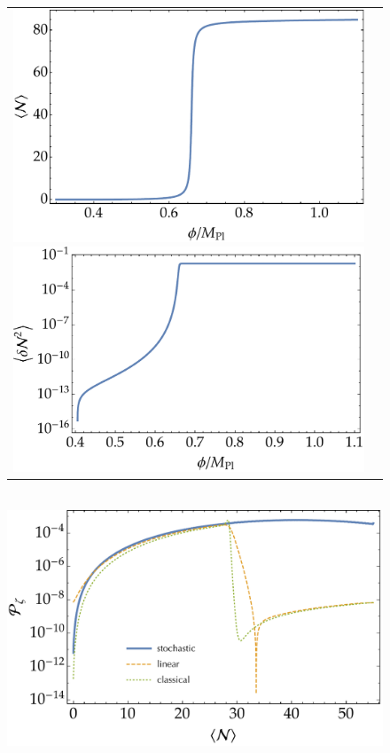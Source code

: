 \documentclass[aps, prd
, preprint
, nofootinbib 
, longbibliography
]{revtex4-1}
\begin{document}
\begin{figure}
	\centering
	\begin{tabular}{cc}
		\begin{minipage}{0.5\hsize}
			\centering
			\includegraphics[width=0.9\hsize]{figs/inflection/N_conf.pdf}
		\end{minipage}
		\begin{minipage}{0.5\hsize}
			\centering
			\includegraphics[width=0.9\hsize]{figs/inflection/dN2_conf.pdf}
		\end{minipage}
	\end{tabular} \\[10pt]
	\includegraphics[width=0.5\hsize]{figs/inflection/Pzeta_conf.pdf}
	\caption{}
	\label{figs: inflection_conf}
\end{figure}
\end{document}
